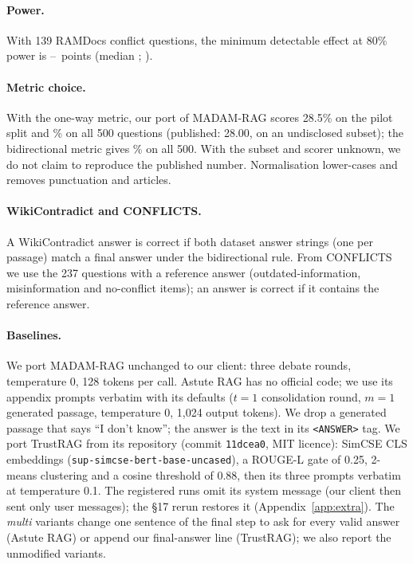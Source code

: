 \paragraph{Power.} With 139 RAMDocs conflict questions, the minimum detectable effect at 80\% power is
\mdeLo--\mdeHi\ points (median \mdeMed; \citealp{card2020power}).

\paragraph{Metric choice.} With the one-way metric, our port of MADAM-RAG scores 28.5\% on the pilot split and
\madamOneWay\% on all 500 questions (published: 28.00, on an undisclosed subset); the bidirectional metric gives
\madamBidir\% on all 500. With the subset and scorer unknown, we do not claim to reproduce the
published number. Normalisation lower-cases and removes punctuation and articles.

\paragraph{WikiContradict and CONFLICTS.} A WikiContradict answer is correct if both dataset answer strings
(one per passage) match a final answer under the bidirectional rule. From CONFLICTS we use the 237 questions with
a reference answer (outdated-information, misinformation and no-conflict items); an answer is correct if it
contains the reference answer.

\paragraph{Baselines.} We port MADAM-RAG unchanged to our client: three debate rounds, temperature 0, 128 tokens
per call. Astute RAG has no official code; we use its appendix prompts verbatim with its defaults
($t{=}1$ consolidation round, $m{=}1$ generated passage, temperature 0, 1,024 output tokens). We drop a generated
passage that says ``I don't know''; the answer is the text in its \texttt{<ANSWER>} tag. We port
TrustRAG from its repository (commit \texttt{11dcea0}, MIT licence): SimCSE CLS embeddings
(\texttt{sup-simcse-bert-base-uncased}), a ROUGE-L gate of 0.25, 2-means clustering and a cosine threshold of 0.88,
then its three prompts verbatim at temperature 0.1. The registered runs omit its system message (our client then sent only user messages); the \S17 rerun restores it (Appendix~\ref{app:extra}). The \emph{multi} variants change one sentence of the final step to ask for every valid answer
(Astute RAG) or append our final-answer line (TrustRAG); we also report the unmodified variants.

